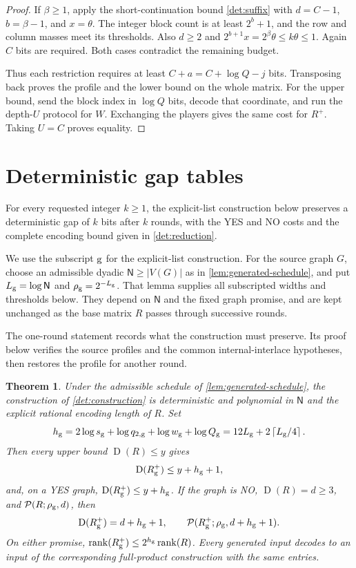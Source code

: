 \documentclass[11pt]{article} \usepackage[utf8]{inputenc}
\theoremstyle{plain} \newtheorem{theorem}{Theorem}[section]
\theoremstyle{definition} \newaliascnt{definition}{theorem}
\newcommand{\D}{\operatorname{D}}
\newcommand{\RP}[3]{\mathcal{P}(#1;#2,#3)}
\newcommand{\ceil}[1]{\left\lceil#1\right\rceil}
\DeclareMathOperator{\rank}{rank} \crefname{claim}{Claim}{Claims}
\begin{document}
\begin{proof}
If $\beta\ge1$, apply the short-continuation bound \cref{det:suffix} with
$d=C-1$, $b=\beta-1$, and $x=\theta$. The integer block count is at least
$2^b+1$, and the row and column masses meet its thresholds. Also $d\ge2$ and
$2^{b+1}x=2^\beta\theta\le k\theta\le1$. Again $C$ bits are required.
Both cases contradict the remaining budget.

Thus each restriction requires at least $C+a=C+\log Q-j$ bits. Transposing
back proves the profile and the lower bound on the whole matrix. For the
upper bound, send the block index in $\log Q$ bits, decode that coordinate,
and run the depth-$U$ protocol for $W$. Exchanging the players gives the
same cost for $R^+$. Taking $U=C$ proves equality.
\end{proof}

\section{Deterministic gap tables}\label{sec:deterministic}
\label{sec:deterministic_amplification}

For every requested integer \(k\ge1\), the explicit-list construction below
preserves a deterministic gap of \(k\) bits after \(k\) rounds, with the YES and
NO costs and the complete encoding bound given in \cref{det:reduction}.

We use the subscript $\rm g$ for the explicit-list construction. For the
source graph $G$, choose an admissible dyadic $\mathsf N\ge |V(G)|$ as in
\cref{lem:generated-schedule}, and put $L_{\rm g}=\log\mathsf N$ and
$\rho_{\rm g}=2^{-L_{\rm g}}$. That lemma supplies all subscripted widths and
thresholds below. They depend on $\mathsf N$ and the fixed graph promise,
and are kept unchanged as the base matrix $R$ passes through successive rounds.

The one-round statement records what the construction must preserve. Its
proof below verifies the source profiles and the common internal-interlace
hypotheses, then restores the profile for another round.

\begin{theorem}\label{det:amplifier}
Under the admissible schedule of \cref{lem:generated-schedule}, the
construction of \cref{det:construction} is
deterministic and polynomial in \(\mathsf N\) and the explicit rational encoding
length of \(R\). Set
\[
h_{\rm g}=2\log s_{\rm g}+\log q_{2,\rm g}+\log w_{\rm g}+\log Q_{\rm g}
=12L_{\rm g}+2\ceil{L_{\rm g}/4}.
\]
Then every upper bound \(\D(R)\le y\) gives
\[
\D(R_{\rm g}^{+})\le y+h_{\rm g}+1,
\]
and, on a YES graph, \(\D(R_{\rm g}^{+})\le y+h_{\rm g}\). If the graph is NO,
\(\D(R)=d\ge3\), and \(\RP{R}{\rho_{\rm g}}d\), then
\[
\D(R_{\rm g}^{+})=d+h_{\rm g}+1,\qquad \RP{R_{\rm g}^{+}}{\rho_{\rm g}}{d+h_{\rm
g}+1}.
\]
On either promise, \(\rank(R_{\rm g}^{+})\le2^{h_{\rm g}}\rank(R)\). Every
generated input decodes to an input of the corresponding full-product
construction with the same entries.
\end{theorem}
\end{document}
